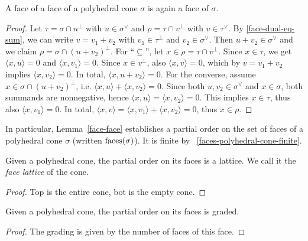 \begin{lemma}
  \label{face-face}
  A face of a face of a polyhedral cone \( \sigma \) is again a face
  of \( \sigma \).
\end{lemma}
\begin{proof}
  Let \( \tau = \sigma \cap u^{\perp} \) with \( u \in \sigma^{\vee}
  \) and \( \rho = \tau \cap v^{\perp} \) with \( v \in \tau^{\vee}
  \). By \ref{face-dual-eq-sum}, we can write \( v = v_1 + v_2 \)
  with \( v_1 \in \tau^{\perp} \) and \( v_2 \in \sigma^{\vee} \).
  Then \( u + v_2 \in \sigma^{\vee} \) and we claim \( \rho = \sigma
  \cap (u + v_2)^{\perp} \). For ``\( \subseteq \)'', let \( x \in
  \rho = \tau \cap v^{\perp} \). Since \( x \in \tau \), we get \(
  \langle x, u \rangle = 0 \) and \( \langle x, v_1 \rangle = 0 \).
  Since \( x \in v^{\perp} \), also \( \langle x, v \rangle = 0 \),
  which by \( v = v_1 + v_2 \) implies \( \langle x, v_2 \rangle = 0
  \). In total, \( \langle x, u + v_2 \rangle = 0 \). For the
  converse, assume \( x \in \sigma \cap (u + v_2)^{\perp} \), i.e. \(
  \langle x, u \rangle + \langle x, v_2 \rangle = 0 \). Since both \(
  u, v_2 \in \sigma^{\vee} \) and \( x \in \sigma \), both summands
  are nonnegative, hence \( \langle x, u \rangle = \langle x, v_2
  \rangle = 0 \). This implies \( x \in \tau \), thus also \( \langle
  x, v_1 \rangle = 0 \). In total, \( \langle x, v \rangle = \langle
  x, v_1 \rangle + \langle x, v_2 \rangle = 0 \), thus \( x \in \rho
  \).
\end{proof}

In particular, Lemma~\ref{face-face} establishes a partial order on
the set of faces of a polyhedral cone \( \sigma \) (written \(
\operatorname{faces}(\sigma) \)). It is finite by
~\ref{faces-polyhedral-cone-finite}.

\begin{lemma}
  \label{face-lattice}
  \uses{}
  Given a polyhedral cone, the partial order on its faces
  is a lattice. We call it the \emph{face lattice} of the cone.
\end{lemma}
\begin{proof}
Top is the entire cone, bot is the empty cone.
\end{proof}

\begin{lemma}
  \label{face-lattice-graded}
  Given a polyhedral cone, the partial order on its faces
  is graded.
\end{lemma}
\begin{proof}
The grading is given by the number of faces of this face.
\end{proof}

